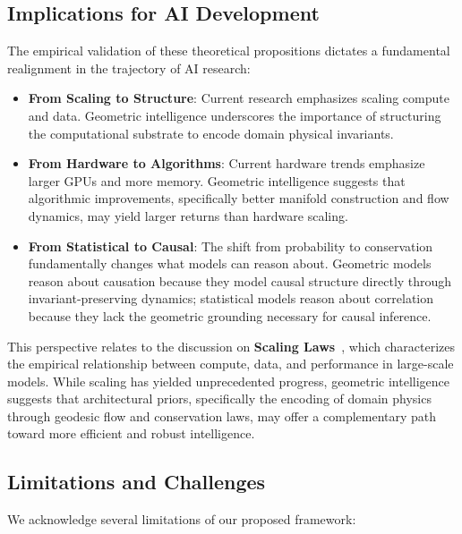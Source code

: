\documentclass[12pt,a4paper]{article}
\begin{document}
\subsection{Implications for AI Development}
\label{sec:implications}

The empirical validation of these theoretical propositions dictates a fundamental realignment in the trajectory of AI research:

\begin{itemize}
    \item \textbf{From Scaling to Structure}: Current research emphasizes scaling compute and data. Geometric intelligence underscores the importance of structuring the computational substrate to encode domain physical invariants.

    \item \textbf{From Hardware to Algorithms}: Current hardware trends emphasize larger GPUs and more memory. Geometric intelligence suggests that algorithmic improvements, specifically better manifold construction and flow dynamics, may yield larger returns than hardware scaling.

    \item \textbf{From Statistical to Causal}: The shift from probability to conservation fundamentally changes what models can reason about. Geometric models reason about causation because they model causal structure directly through invariant-preserving dynamics; statistical models reason about correlation because they lack the geometric grounding necessary for causal inference.
\end{itemize}

This perspective relates to the discussion on \textbf{Scaling Laws}~\cite{kaplan2020}, which characterizes the empirical relationship between compute, data, and performance in large-scale models. While scaling has yielded unprecedented progress, geometric intelligence suggests that architectural priors, specifically the encoding of domain physics through geodesic flow and conservation laws, may offer a complementary path toward more efficient and robust intelligence.

\subsection{Limitations and Challenges}
\label{sec:limitations}

We acknowledge several limitations of our proposed framework:
\end{document}
